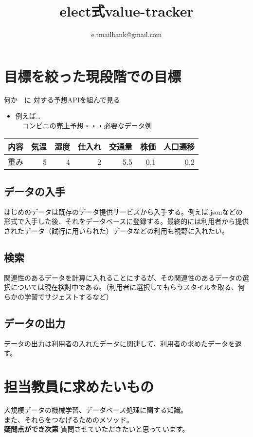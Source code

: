 \documentclass{scrartcl}
\author{e.tmailbank@gmail.com}
\date{}
\title{elect式value-tracker}
\begin{document}
\maketitle
\section{目標を絞った現段階での目標}
\label{sec:org9a1ecae}
何か　に 対する予想APIを組んで見る\\
\begin{itemize}
\item 例えば\ldots{}\\
　コンビニの売上予想・・・必要なデータ例\\
\end{itemize}
\begin{center}
\begin{tabular}{lrrrrrr}
\hline
内容 & 気温 & 湿度 & 仕入れ & 交通量 & 株価 & 人口遷移\\
\hline
重み & 5 & 4 & 2 & 5.5 & 0.1 & 0.2\\
\hline
\end{tabular}
\end{center}
\subsection{データの入手}
\label{sec:orgca3e0b9}
はじめのデータは既存のデータ提供サービスから入手する。例えば.jsonなどの形式で入手した後、それをデータベースに登録する。最終的には利用者から提供されたデータ（試行に用いられた）データなどの利用も視野に入れたい。\\
\subsection{検索}
\label{sec:org518e0ec}
関連性のあるデータを計算に入れることにするが、その関連性のあるデータの選択については現在検討中である。（利用者に選択してもらうスタイルを取る、何らかの学習でサジェストするなど）\\
\subsection{データの出力}
\label{sec:org758f17f}
データの出力は利用者の入れたデータに関連して、利用者の求めたデータを返す。\\
\section{担当教員に求めたいもの}
\label{sec:org86fe735}
 大規模データの機械学習、データベース処理に関する知識。\\
また、それらをつなげるためのメソッド。\\
 \textbf{疑問点ができ次第} 質問させていただきたいと思っています。\\
\end{document}
